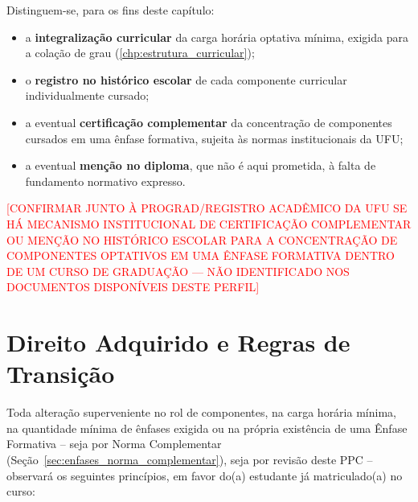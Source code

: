 Distinguem-se, para os fins deste capítulo:

\begin{itemize}
    \item a \textbf{integralização curricular} da carga horária optativa mínima, exigida para a colação de grau (\autoref{chp:estrutura_curricular});
    \item o \textbf{registro no histórico escolar} de cada componente curricular individualmente cursado;
    \item a eventual \textbf{certificação complementar} da concentração de componentes cursados em uma ênfase formativa, sujeita às normas institucionais da UFU;
    \item a eventual \textbf{menção no diploma}, que não é aqui prometida, à falta de fundamento normativo expresso.
\end{itemize}

\textcolor{red}{[CONFIRMAR JUNTO À PROGRAD/REGISTRO ACADÊMICO DA UFU SE HÁ MECANISMO INSTITUCIONAL DE CERTIFICAÇÃO COMPLEMENTAR OU MENÇÃO NO HISTÓRICO ESCOLAR PARA A CONCENTRAÇÃO DE COMPONENTES OPTATIVOS EM UMA ÊNFASE FORMATIVA DENTRO DE UM CURSO DE GRADUAÇÃO — NÃO IDENTIFICADO NOS DOCUMENTOS DISPONÍVEIS DESTE PERFIL]}

\section{Direito Adquirido e Regras de Transição}
\label{sec:enfases_transicao}

Toda alteração superveniente no rol de componentes, na carga horária mínima, na quantidade mínima de ênfases exigida ou na própria existência de uma Ênfase Formativa -- seja por Norma Complementar (Seção~\ref{sec:enfases_norma_complementar}), seja por revisão deste PPC -- observará os seguintes princípios, em favor do(a) estudante já matriculado(a) no curso:

